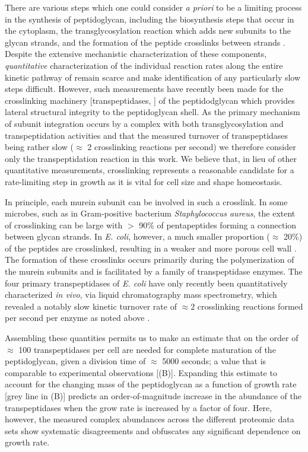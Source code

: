 There are various steps which one could consider \textit{a priori} to be a
limiting process in the synthesis of peptidoglycan, including the
biosynthesis steps that occur in the cytoplasm, the transglycosylation
reaction which adds new subunits to the glycan strands, and the formation
of the peptide crosslinks between strands
\citep{shi2018,morgenstein2015,lovering2012,barreteau2008}. Despite the
extensive mechanistic characterization of these components,
\textit{quantitative} characterization of the individual reaction rates along
the entire kinetic pathway of remain scarce and make identification of any
particularly slow steps difficult. However, such measurements have recently
been made for the crosslinking machinery [transpeptidases,
\cite{catherwood2020}] of the peptidodglycan which provides lateral
structural integrity to the peptidoglycan shell. As the primary mechanism of
subunit integration occurs by a complex with both transglycosylation and
transpeptidation activities \citep{shi2018} and that the measured turnover of
transpeptidases being rather slow ($\approx$ 2 crosslinking reactions per
second) we therefore consider only the transpeptidation reaction in this
work. We believe that, in lieu of other quantitative measurements,
crosslinking represents a reasonable candidate for a rate-limiting step in
growth as it is vital for cell size and shape homeostasis.

In principle, each murein subunit can be involved in such a crosslink. In
some microbes, such as in Gram-positive bacterium \textit{Staphylococcus
aureus}, the extent of crosslinking can be large with $>$ 90\% of
pentapeptides forming a connection between glycan strands. In \textit{E.
coli}, however, a much smaller proportion ($\approx$ 20\%) of the peptides
are crosslinked, resulting in a weaker and more porous cell wall
\citep{vollmer2008a, rogers1980}. The formation of these crosslinks occurs
primarily during the polymerization of the murein subunits and is facilitated
by a family of transpeptidase enzymes. The four primary transpeptidases of
\textit{E. coli} have only recently been quantitatively characterized
\textit{in vivo}, via liquid chromatography mass spectrometry, which revealed
a notably slow kinetic turnover rate of $\approx 2$ crosslinking reactions
formed per second per enzyme as  noted above \citep{catherwood2020}.

Assembling these quantities permits us to make an estimate that on the order
of $\approx$ 100 transpeptidases per cell are needed for complete maturation
of the peptidoglycan, given a division time of $\approx$ 5000 seconds; a
value that is comparable to experimental observations
[(B)]. Expanding this estimate to account for the changing
mass of the peptidoglycan as a function of growth rate [grey line in
(B)] predicts an order-of-magnitude increase in the
abundance of the transpeptidases when the grow rate is increased by a factor
of four. Here, however, the measured complex abundances across the different proteomic data sets show systematic disagreements and obfuscates any significant dependence on growth rate.

